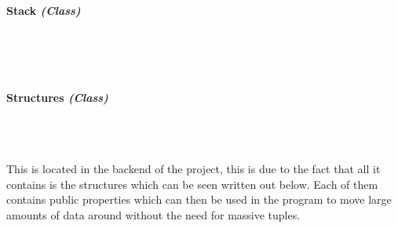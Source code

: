 \begin{FlushLeft}
    \paragraph{Stack \textit{(Class)}} \mbox{} \\

    \begin{figure}[H]
        \centering
    \end{figure}\\

    \bk

    \paragraph{Structures \textit{(Class)}} \mbox{} \\

    \begin{figure}[H]
        \centering
    \end{figure}\\

    This is located in the backend of the project, this is due to the fact that all it contains is the structures which can be seen written out below. Each of them contains public properties which can then be used in the program to move large amounts of data around without the need for massive tuples.


\end{FlushLeft}
